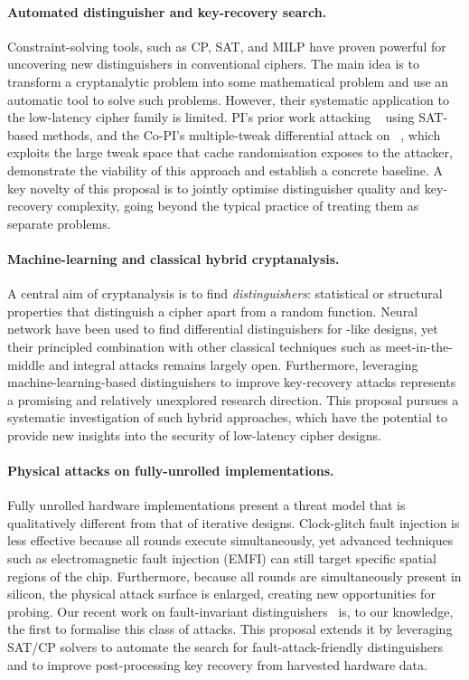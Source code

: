 \paragraph{Automated distinguisher and key-recovery search.}
Constraint-solving tools, such as CP, SAT, and MILP have proven powerful for uncovering new distinguishers in conventional ciphers.
The main idea is to transform a cryptanalytic problem into some mathematical problem and use an automatic tool to solve such problems.
However, their systematic application to the low-latency cipher family is limited.
PI's prior work attacking ~ using SAT-based methods, and the Co-PI's multiple-tweak differential attack on ~, which exploits the large tweak space that cache randomisation exposes to the attacker, demonstrate the viability of this approach and establish a concrete baseline.
A key novelty of this proposal is to jointly optimise distinguisher quality and key-recovery complexity, going beyond the typical practice of treating them as separate problems.

\paragraph{Machine-learning and classical hybrid cryptanalysis.}
A central aim of cryptanalysis is to find \emph{distinguishers}: statistical or structural properties that distinguish a cipher apart from a random function.
Neural network have been used to find differential distinguishers for -like designs, yet their principled combination with other classical techniques such as meet-in-the-middle and integral attacks remains largely open.
Furthermore, leveraging machine-learning-based distinguishers to improve key-recovery attacks represents a promising and relatively unexplored research direction.
This proposal pursues a systematic investigation of such hybrid approaches, which have the potential to provide new insights into the security of low-latency cipher designs.

\paragraph{Physical attacks on fully-unrolled implementations.}
Fully unrolled hardware implementations present a threat model that is qualitatively different from that of iterative designs.
Clock-glitch fault injection is less effective because all rounds execute simultaneously, yet advanced techniques such as electromagnetic fault injection (EMFI) can still target specific spatial regions of the chip.
Furthermore, because all rounds are simultaneously present in silicon, the physical attack surface is enlarged, creating new opportunities for probing.
Our recent work on fault-invariant distinguishers~ is, to our knowledge, the first to formalise this class of attacks. This proposal extends it by leveraging SAT/CP solvers to automate the search for fault-attack-friendly distinguishers and to improve post-processing key recovery from harvested hardware data.


